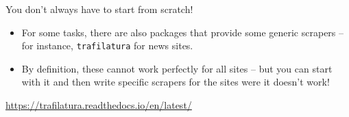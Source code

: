 \begin{frame}{You don't always have to start from scratch!}
\begin{itemize}
\item  For some tasks, there are also packages that provide some generic scrapers -- for instance, \texttt{trafilatura} for news sites.
\item   By definition, these cannot work perfectly for all sites -- but you can start with it and then write specific scrapers for the sites were it doesn't work!
\end{itemize}

  \tiny{\url{https://trafilatura.readthedocs.io/en/latest/}}
\end{frame}
